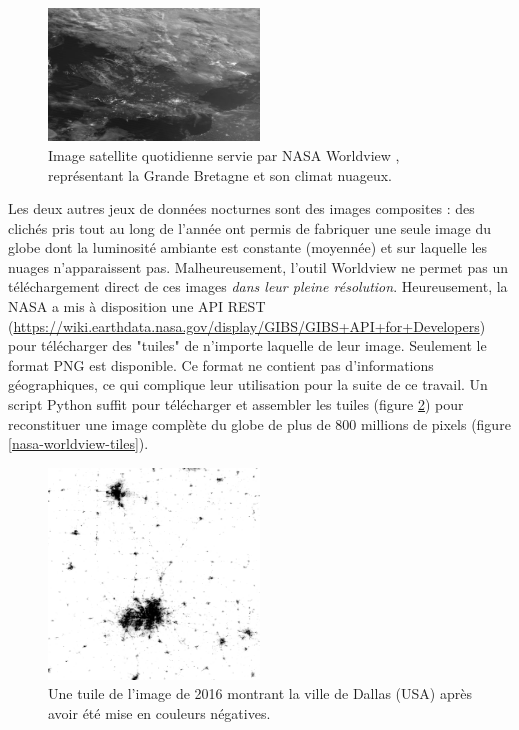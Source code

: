 \documentclass[a4paper, 11pt]{report}
\begin{document}
\begin{figure}[h]
	\centering
	\includegraphics[width=0.5\textwidth]{img/worldview_clouds.JPG}
	\caption{Image satellite quotidienne servie par NASA Worldview \cite{nasa-worldview}, représentant la Grande Bretagne et son climat nuageux.}
	\label{nasa-worldview-daily}
\end{figure}

Les deux autres jeux de données nocturnes sont des images composites : des clichés pris tout au long de l'année ont permis de fabriquer une seule image du globe dont la luminosité ambiante est constante (moyennée) et sur laquelle les nuages n'apparaissent pas. Malheureusement, l'outil Worldview ne permet pas un téléchargement direct de ces images \textit{dans leur pleine résolution}. Heureusement, la NASA a mis à disposition une API REST (\url{https://wiki.earthdata.nasa.gov/display/GIBS/GIBS+API+for+Developers}) pour télécharger des "tuiles" de n'importe laquelle de leur image. Seulement le format PNG est disponible. Ce format ne contient pas d'informations géographiques, ce qui complique leur utilisation pour la suite de ce travail. Un script Python suffit pour télécharger et assembler les tuiles (figure \ref{nasa-worldview-tile}) pour reconstituer une image complète du globe de plus de 800 millions de pixels (figure \ref{nasa-worldview-tiles}).

\begin{figure}[h]
	\centering
	\includegraphics[width=0.5\textwidth]{img/018-012.png}
	\caption{Une tuile de l'image de 2016 montrant la ville de Dallas (USA) après avoir été mise en couleurs négatives.}
	\label{nasa-worldview-tile}
\end{figure}
\end{document}
